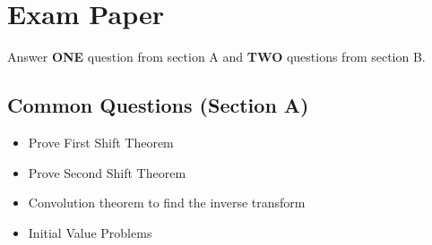 \documentclass[a4paper, 10pt]{article}
\begin{document}
\section{Exam Paper}
Answer \textbf{ONE} question from section A and \textbf{TWO} questions from section B. \\ 
\subsection{Common Questions (Section A)}
\begin{itemize}
  \item Prove First Shift Theorem
  \item Prove Second Shift Theorem
  \item Convolution theorem to find the inverse transform 
  \item Initial Value Problems
\end{itemize}
\end{document}

